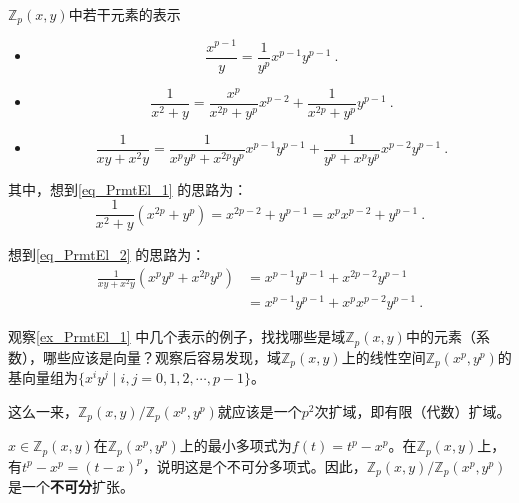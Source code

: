 \begin{example}{$\mathbb{Z}_p(x, y)$中若干元素的表示}\label{ex_PrmtEl_1}


\begin{itemize}

\item 
\begin{equation}
\frac{x^{p-1}}{y} = \frac{1}{y^p}x^{p-1}y^{p-1}~.
\end{equation}

\item 
\begin{equation}\label{eq_PrmtEl_1}
\frac{1}{x^2+y} = \frac{x^p}{x^{2p}+y^p}x^{p-2} + \frac{1}{x^{2p}+y^p}y^{p-1}~.
\end{equation}

\item 
\begin{equation}\label{eq_PrmtEl_2}
\frac{1}{xy+x^2y} = \frac{1}{x^py^p+x^{2p}y^p}x^{p-1}y^{p-1}+\frac{1}{y^p+x^{p}y^p}x^{p-2}y^{p-1}~.
\end{equation}

\end{itemize}



其中，想到\autoref{eq_PrmtEl_1} 的思路为：
\begin{equation}
\frac{1}{x^2+y}(x^{2p}+y^p) = x^{2p-2}+y^{p-1} = x^px^{p-2}+y^{p-1}~.
\end{equation}

想到\autoref{eq_PrmtEl_2} 的思路为：
\begin{equation}
\begin{aligned}
\frac{1}{xy+x^2y}(x^py^p+x^{2p}y^p) &= x^{p-1}y^{p-1}+x^{2p-2}y^{p-1} \\
&= x^{p-1}y^{p-1}+x^px^{p-2}y^{p-1}~.
\end{aligned}
\end{equation}

\end{example}

观察\autoref{ex_PrmtEl_1} 中几个表示的例子，找找哪些是域$\mathbb{Z}_p(x, y)$中的元素（系数），哪些应该是向量？观察后容易发现，域$\mathbb{Z}_p(x, y)$上的线性空间$\mathbb{Z}_p(x^p, y^p)$的基向量组为$\{x^iy^j\mid i, j=0, 1, 2, \cdots, p-1\}$。

这么一来，$\mathbb{Z}_p(x, y)/\mathbb{Z}_p(x^p, y^p)$就应该是一个$p^2$次扩域，即有限（代数）扩域。

$x\in\mathbb{Z}_p(x, y)$在$\mathbb{Z}_p(x^p, y^p)$上的最小多项式为$f(t)=t^p-x^p$。在$\mathbb{Z}_p(x, y)$上，有$t^p-x^p=(t-x)^p$，说明这是个不可分多项式。因此，$\mathbb{Z}_p(x, y)/\mathbb{Z}_p(x^p, y^p)$是一个\textbf{不可分}扩张。

